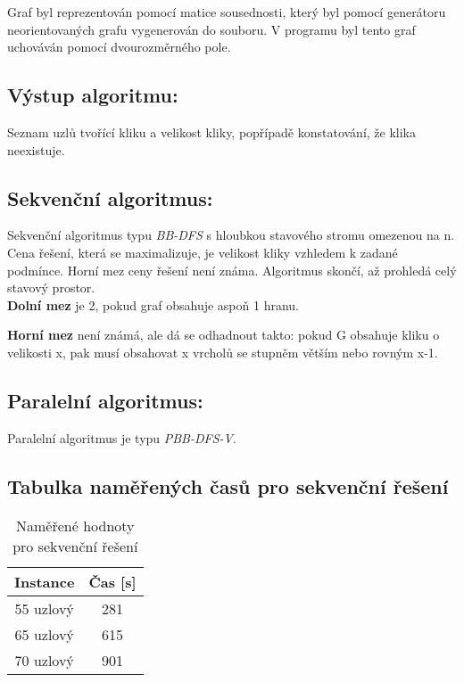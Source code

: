 \documentclass[11pt]{article}
\begin{document}
Graf byl reprezentován pomocí matice sousednosti, který byl pomocí generátoru neorientovaných grafu vygenerován do souboru. V programu byl tento graf uchováván pomocí dvourozměrného pole.

\subsection{Výstup algoritmu:}
Seznam uzlů tvořící kliku a velikost kliky, popřípadě konstatování, že klika neexistuje.

\subsection{Sekvenční algoritmus:}
Sekvenční algoritmus typu \textit{BB-DFS} s hloubkou stavového stromu omezenou na n. Cena řešení, která se maximalizuje, je velikost kliky vzhledem k zadané podmínce. Horní mez ceny řešení není známa. Algoritmus skončí, až prohledá celý stavový prostor. \\

\textbf{Dolní mez} je 2, pokud graf obsahuje aspoň 1 hranu.

\textbf{Horní mez} není známá, ale dá se odhadnout takto: pokud G obsahuje kliku o velikosti x, pak musí obsahovat x vrcholů se stupněm větším nebo rovným x-1.

\subsection{Paralelní algoritmus:}
Paralelní algoritmus je typu \textit{PBB-DFS-V}.

\subsection{Tabulka naměřených časů pro sekvenční řešení}
\begin{table}[h]
	\caption{Naměřené hodnoty pro sekvenční řešení}
	\label{tab:namereneHodnotySekvencni}
	\centering
	\begin{tabular}{| c | c |}
		\hline
		\textbf{Instance} & \textbf{Čas [s]} \\
		\hline \hline
		
		55 uzlový & 281 \\
		65 uzlový & 615 \\
		70 uzlový & 901 \\

		\hline
	\end{tabular}
\end{table}
\end{document}
